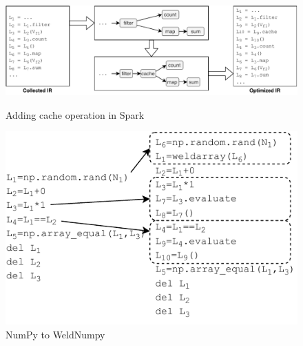 \documentclass[sigconf]{acmart}\settopmatter{printfolios=true,printccs=false,printacmref=false}\setcopyright{none}
\begin{document}
\label{sec:reducenumpy}


\begin{figure}[ht]
\begin{minipage}[b]{0.6\linewidth}
  \centering
  \includegraphics[width=\textwidth]{figure/merge_spark.pdf}
  \caption{Adding cache operation in Spark}
  \label{fig:sparkcache}
\end{minipage}
\hspace{0.05\linewidth}
\begin{minipage}[b]{0.3\linewidth}
  \centering
  \includegraphics[trim=1 0 4 0,clip,width=\textwidth]{figure/weldnumpy.pdf}
  \caption{NumPy to WeldNumpy}
  \label{fig:weldnumpy}
\end{minipage}
\end{figure}
\end{document}
